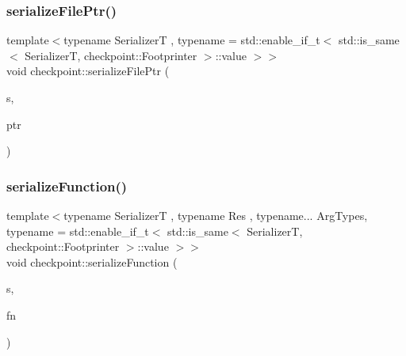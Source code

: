 \mbox{\label{namespacecheckpoint_ad037fd5d89690d3232ec92d54da9f887}} 
\subsubsection{\texorpdfstring{serialize\+File\+Ptr()}{serializeFilePtr()}}
{\footnotesize\ttfamily template$<$typename SerializerT , typename  = std\+::enable\+\_\+if\+\_\+t$<$    std\+::is\+\_\+same$<$      Serializer\+T,      checkpoint\+::\+Footprinter    $>$\+::value  $>$$>$ \\
void checkpoint\+::serialize\+File\+Ptr (\begin{DoxyParamCaption}\item[{SerializerT \&}]{s,  }\item[{F\+I\+LE $\ast$}]{ptr }\end{DoxyParamCaption})}

\mbox{\label{namespacecheckpoint_a4161978e6d6de385d942cbcbe659817a}} 
\subsubsection{\texorpdfstring{serialize\+Function()}{serializeFunction()}}
{\footnotesize\ttfamily template$<$typename SerializerT , typename Res , typename... Arg\+Types, typename  = std\+::enable\+\_\+if\+\_\+t$<$    std\+::is\+\_\+same$<$      Serializer\+T,      checkpoint\+::\+Footprinter    $>$\+::value  $>$$>$ \\
void checkpoint\+::serialize\+Function (\begin{DoxyParamCaption}\item[{SerializerT \&}]{s,  }\item[{std\+::function$<$ Res(Arg\+Types...)$>$ \&}]{fn }\end{DoxyParamCaption})}

\mbox{\label{namespacecheckpoint_a99092baac18b33d03b1bb47ed1f2d7fa}} 
